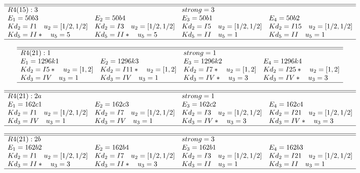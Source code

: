 \documentclass[11pt]{article}
\theoremstyle{definition}
\begin{document}
$$
 \begin{array}{llll}
 \hline 
\hline 
  R4(15):3  &   & strong=3\\
 E_1=50b3 & E_2=50b4 & E_3=50b1 & E_4=50b2 \\
  Kd_{2}=I1\quad u_{2}=[ 1/2, 1/2 ]&  Kd_{2}=I3\quad u_{2}=[ 1/2, 1/2 ]&  Kd_{2}=I5\quad u_{2}=[ 1/2, 1/2 ]&  Kd_{2}=I15\quad u_{2}=[ 1/2, 1/2 ]\\
  Kd_{5}=II*\quad u_{5}=5&  Kd_{5}=II*\quad u_{5}=5&  Kd_{5}=II\quad u_{5}=1&  Kd_{5}=II\quad u_{5}=1\\
\hline
\end{array}
 $$


$$
 \begin{array}{llll}
 \hline 
\hline 
  R4(21):1  &   & strong=1\\
 E_1=1296k1 & E_2=1296k3 & E_3=1296k2 & E_4=1296k4 \\
  Kd_{2}=I5*\quad u_{2}=[ 1, 2 ]&  Kd_{2}=I11*\quad u_{2}=[ 1, 2 ]&  Kd_{2}=I7*\quad u_{2}=[ 1, 2 ]&  Kd_{2}=I25*\quad u_{2}=[ 1, 2 ]\\
  Kd_{3}=IV\quad u_{3}=1&  Kd_{3}=IV\quad u_{3}=1&  Kd_{3}=IV*\quad u_{3}=3&  Kd_{3}=IV*\quad u_{3}=3\\
\hline
\end{array}
 $$


$$
 \begin{array}{llll}
 \hline 
\hline 
  R4(21):2a  &   & strong=1\\
 E_1=162c1 & E_2=162c3 & E_3=162c2 & E_4=162c4 \\
  Kd_{2}=I1\quad u_{2}=[ 1/2, 1/2 ]&  Kd_{2}=I7\quad u_{2}=[ 1/2, 1/2 ]&  Kd_{2}=I3\quad u_{2}=[ 1/2, 1/2 ]&  Kd_{2}=I21\quad u_{2}=[ 1/2, 1/2 ]\\
  Kd_{3}=IV\quad u_{3}=1&  Kd_{3}=IV\quad u_{3}=1&  Kd_{3}=IV*\quad u_{3}=3&  Kd_{3}=IV*\quad u_{3}=3\\
\hline
\end{array}
 $$


$$
 \begin{array}{llll}
 \hline 
\hline 
  R4(21):2b  &   & strong=3\\
 E_1=162b2 & E_2=162b4 & E_3=162b1 & E_4=162b3 \\
  Kd_{2}=I1\quad u_{2}=[ 1/2, 1/2 ]&  Kd_{2}=I7\quad u_{2}=[ 1/2, 1/2 ]&  Kd_{2}=I3\quad u_{2}=[ 1/2, 1/2 ]&  Kd_{2}=I21\quad u_{2}=[ 1/2, 1/2 ]\\
  Kd_{3}=II*\quad u_{3}=3&  Kd_{3}=II*\quad u_{3}=3&  Kd_{3}=II\quad u_{3}=1&  Kd_{3}=II\quad u_{3}=1\\
\hline
\end{array}
 $$
\end{document}
